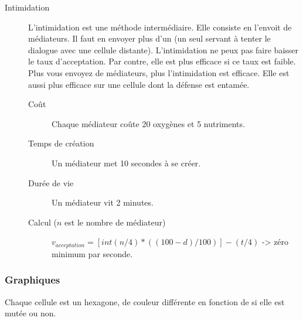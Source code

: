 \documentclass{article}
\begin{document}
\begin{description}
	\item[Intimidation]\label{intimi}
		L'intimidation est une méthode intermédiaire. Elle consiste en l'envoit de médiateurs. Il faut en envoyer plus d'un (un seul servant à tenter le dialogue avec une cellule distante). L'intimidation ne peux pas faire baisser le taux d'acceptation. Par contre, elle est plus efficace si ce taux est faible. Plus vous envoyez de médiateurs, plus l'intimidation est efficace. Elle est aussi plus efficace sur une cellule dont la défense est entamée.
		\begin{description}
			\item[Coût] Chaque médiateur coûte 20 oxygènes et 5 nutriments.
			\item[Temps de création] Un médiateur met 10 secondes à se créer.
			\item[Durée de vie] Un médiateur vit 2 minutes.
			\item[Calcul ($n$ est le nombre de médiateur)] $v_{acceptation} = [int(n/4) * ((100-d) / 100)] - (t/4)$ -> zéro minimum par seconde.
		\end{description}
\end{description}

\subsubsection{Graphiques}
Chaque cellule est un hexagone, de couleur différente en fonction de si elle est mutée ou non. %
\end{document}
